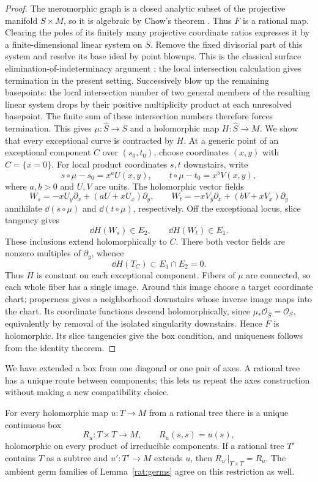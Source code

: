 \begin{proof}
The meromorphic graph is a closed analytic subset of the projective
manifold $S\times M$, so it is algebraic by Chow's theorem
\cite[Proposition~13]{Serre56}. Thus $F$ is a rational map. Clearing
the poles of its finitely many projective coordinate ratios expresses
it by a finite-dimensional linear system on $S$. Remove the fixed
divisorial part of this system and resolve its base ideal by point
blowups. This is the classical surface elimination-of-indeterminacy argument
\cite{Beauville96}; the local intersection calculation gives termination
in the present setting.
Successively blow up the remaining basepoints: the local intersection number of two general
members of the resulting linear system drops by their positive
multiplicity product at each unresolved basepoint. The finite sum of
these intersection numbers therefore forces termination. This gives
$\mu:\widehat S\to S$ and a holomorphic map $H:\widehat S\to M$.
We show that every exceptional curve is contracted by $H$. At a generic
point of an exceptional component $C$ over $(s_0,t_0)$, choose
coordinates $(x,y)$ with $C=\{x=0\}$. For local product coordinates
$s,t$ downstairs, write
\[
s\circ\mu-s_0=x^a U(x,y),\qquad
t\circ\mu-t_0=x^b V(x,y),
\]
where $a,b>0$ and $U,V$ are units. The holomorphic vector fields
\[
W_s=-xU_y\partial_x+(aU+xU_x)\partial_y,
\qquad
W_t=-xV_y\partial_x+(bV+xV_x)\partial_y
\]
annihilate $\dd(s\circ\mu)$ and $\dd(t\circ\mu)$, respectively.
Off the exceptional locus, slice tangency gives
\[
\dd H(W_s)\in E_2,\qquad \dd H(W_t)\in E_1.
\]
These inclusions extend holomorphically to $C$. There both vector
fields are nonzero multiples of $\partial_y$, whence
\[
\dd H(T_C)\subset E_1\cap E_2=0.
\]
Thus $H$ is constant on each exceptional component. Fibers of $\mu$
are connected, so each whole fiber has a single image. Around this
image choose a target coordinate chart; properness gives a neighborhood
downstairs whose inverse image maps into the chart. Its coordinate
functions descend holomorphically, since
$\mu_*\mathcal O_{\widehat S}=\mathcal O_S$, equivalently by removal
of the isolated singularity downstairs. Hence $F$ is holomorphic.
Its slice tangencies give the box condition, and uniqueness follows
from the identity theorem.
\end{proof}

We have extended a box from one diagonal or one pair of axes. A rational
tree has a unique route between components; this lets us repeat the axes
construction without making a new compatibility choice.

\begin{proposition}\label{rat:boxes}
For every holomorphic map $u:T\to M$ from a rational tree there is a
unique continuous box
\[
R_u:T\times T\longrightarrow M,
\qquad R_u(s,s)=u(s),
\]
holomorphic on every product of irreducible components. If a rational
tree $T'$ contains $T$ as a subtree and $u':T'\to M$ extends $u$, then
$R_{u'}|_{T\times T}=R_u$. The ambient germ families of
Lemma~\ref{rat:germs} agree on this restriction as well.
\end{proposition}


